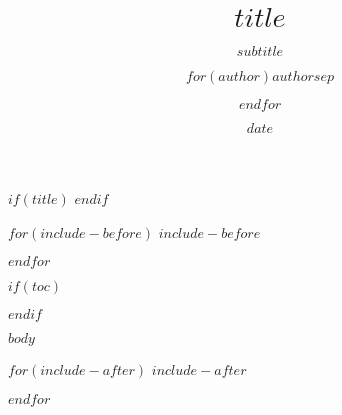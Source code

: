 \documentclass[aspectratio=169,12pt]{beamer}
\title{$title$}
\subtitle{$subtitle$}
\author{$for(author)$$author$$sep$ \and $endfor$}
\date{$date$}
\begin{document}
$if(title)$
\frame{\titlepage}
$endif$

$for(include-before)$
$include-before$

$endfor$

$if(toc)$
\begin{frame}
\tableofcontents[hideallsubsections]
\end{frame}

$endif$

$body$

$for(include-after)$
$include-after$

$endfor$
\end{document}
